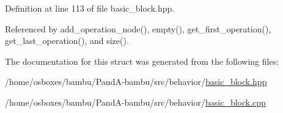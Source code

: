 Definition at line 113 of file basic\+\_\+block.\+hpp.



Referenced by add\+\_\+operation\+\_\+node(), empty(), get\+\_\+first\+\_\+operation(), get\+\_\+last\+\_\+operation(), and size().



The documentation for this struct was generated from the following files\+:\begin{DoxyCompactItemize}
\item 
/home/osboxes/bambu/\+Pand\+A-\/bambu/src/behavior/\hyperlink{basic__block_8hpp}{basic\+\_\+block.\+hpp}\item 
/home/osboxes/bambu/\+Pand\+A-\/bambu/src/behavior/\hyperlink{basic__block_8cpp}{basic\+\_\+block.\+cpp}\end{DoxyCompactItemize}
